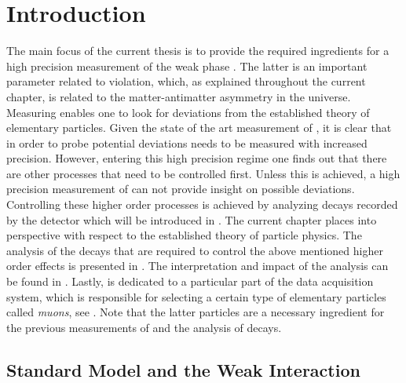 
\chapter{Introduction}
\label{Introduction}

The main focus of the current thesis is to provide the required ingredients for a high precision measurement of
the weak phase \phis. The latter is an important parameter related to \CP violation, which, as explained throughout
the current chapter, is related to the matter-antimatter asymmetry in the universe. Measuring \phis enables one to look
for deviations from the established theory of elementary particles. Given the state of the art measurement of \phis \cite{phis-3fb-paper},
it is clear that in order to probe potential deviations \phis needs to be measured with increased precision.
However, entering this high precision regime one finds out that there are other processes that need to be
controlled first. Unless this is achieved, a high precision measurement of \phis can not provide insight on possible
deviations. Controlling these higher order processes is achieved by analyzing \BsJpsiKst decays recorded
by the \lhcb detector which will be introduced in . The current chapter places \phis into perspective
with respect to the established theory of particle physics. The analysis of the \BsJpsiKst decays that are
required to control the above mentioned higher order effects is presented in .
The interpretation and impact of the analysis can be found in .
Lastly,  is dedicated to a particular part of the \lhcb data acquisition system,
which is responsible for selecting a certain type of elementary particles called {\it muons}, see .
Note that the latter particles are a necessary ingredient for the previous measurements of \phis and
the analysis of \BsJpsiKst decays.

\section{Standard Model and the Weak Interaction}
\label{The_Standard_Model}


